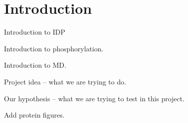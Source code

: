 \section{Introduction} %
\label{sec:introduction}

Introduction to IDP

Introduction to phosphorylation.

Introduction to MD.

Project idea -- what we are trying to do.

Our hypothesis -- what we are trying to test in this project.

Add protein figures.


